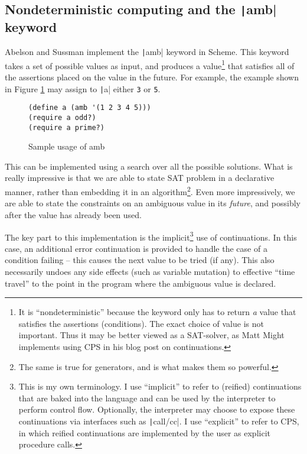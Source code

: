 \documentclass[]{article}
\begin{document}
\subsection{Nondeterministic computing and the \texttt|amb| keyword}
\label{sec:nond}

Abelson and Sussman implement the \texttt|amb| keyword in Scheme. This keyword takes a set of possible values as input, and produces a value\footnote{It is ``nondeterministic'' because the keyword only has to return \textit{a} value that satisfies the assertions (conditions). The exact choice of value is not important. Thus it may be better viewed as a SAT-solver, as Matt Might implements using CPS in his blog post on continuations.} that satisfies all of the assertions placed on the value in the future. For example, the example shown in Figure \ref{fig:amb} may assign to \texttt|a| either \texttt{3} or \texttt{5}.

\begin{figure}[h]
  \centering
\begin{verbatim}
(define a (amb '(1 2 3 4 5)))
(require a odd?)
(require a prime?)
\end{verbatim}
  \caption{Sample usage of amb}
  \label{fig:amb}
\end{figure}

This can be implemented using a search over all the possible solutions. What is really impressive is that we are able to state SAT problem in a declarative manner, rather than embedding it in an algorithm\footnote{The same is true for generators, and is what makes them so powerful.}. Even more impressively, we are able to state the constraints on an ambiguous value in its \textit{future}, and possibly after the value has already been used.

The key part to this implementation is the implicit\footnote{This is my own terminology. I use ``implicit'' to refer to (reified) continuations that are baked into the language and can be used by the interpreter to perform control flow. Optionally, the interpreter may choose to expose these continuations via interfaces such as \texttt|call/cc|. I use ``explicit'' to refer to CPS, in which reified continuations are implemented by the user as explicit procedure calls.} use of continuations. In this case, an additional error continuation is provided to handle the case of a condition failing -- this causes the next value to be tried (if any). This also necessarily undoes any side effects (such as variable mutation) to effective ``time travel'' to the point in the program where the ambiguous value is declared.
\end{document}

